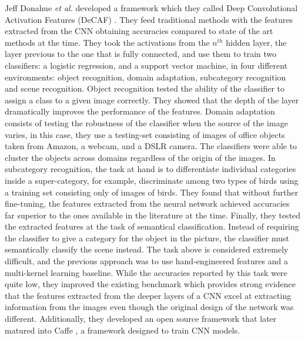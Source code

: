 Jeff Donahue \textit{et al.} developed a framework which they called Deep Convolutional Activation Features (DeCAF) \cite{DBLP:journals/corr/DonahueJVHZTD13}. They feed traditional methods with the features extracted from the CNN obtaining accuracies compared to state of the art methods at the time. They took the activations from the $n^{th}$ hidden layer, the layer previous to the one that is fully connected, and use them to train two classifiers: a logistic regression, and a support vector machine, in four different environments: object recognition, domain adaptation, subcategory recognition and scene recognition. Object recognition tested the ability of the classifier to assign a class to a given image correctly. They showed that the depth of the layer dramatically improves the performance of the features. Domain adaptation consists of testing the robustness of the classifier when the source of the image varies, in this case, they use a testing-set consisting of images of office objects taken from Amazon, a webcam, and a DSLR camera. The classifiers were able to cluster the objects across domains regardless of the origin of the images. In subcategory recognition, the task at hand is to differentiate individual categories inside a super-category, for example, discriminate among two types of birds using a training set consisting only of images of birds. They found that without further fine-tuning, the features extracted from the neural network achieved accuracies far superior to the ones available in the literature at the time. Finally, they tested the extracted features at the task of semantical classification. Instead of requiring the classifier to give a category for the object in the picture, the classifier must semantically classify the scene instead. The task above is considered extremely difficult, and the previous approach was to use hand-engineered features and a multi-kernel learning baseline. While the accuracies reported by this task were quite low, they improved the existing benchmark which provides strong evidence that the features extracted from the deeper layers of a CNN excel at extracting information from the images even though the original design of the network was different. Additionally, they developed an open source framework that later matured into Caffe \cite{jia2014caffe}, a framework designed to train CNN models.\\


